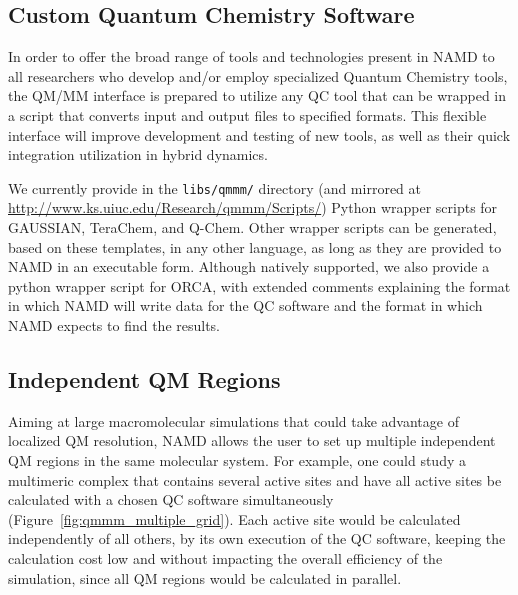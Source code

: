 \subsection{Custom Quantum Chemistry Software}

In order to offer the broad range of tools and technologies present 
in NAMD to all researchers who develop and/or employ specialized 
Quantum Chemistry tools, the QM/MM interface is prepared to utilize 
any QC tool that can be wrapped in a script that converts input and 
output files to specified formats. This flexible interface will 
improve development and testing of new tools, as well as their 
quick integration utilization in hybrid dynamics.

We currently provide 
in the \texttt{libs/qmmm/} directory
(and mirrored at
\url{http://www.ks.uiuc.edu/Research/qmmm/Scripts/})
Python wrapper scripts for GAUSSIAN, TeraChem, and Q-Chem.
Other wrapper scripts can be generated, based on these templates,
in any other language,
as long as they are provided to NAMD in an executable form.
Although natively supported,
we also provide a python wrapper script for ORCA,
with extended comments explaining the format in which NAMD will write 
data for the QC software and the format in which NAMD expects to find 
the results.


\subsection{Independent QM Regions}

Aiming at large macromolecular simulations that could take advantage 
of localized QM resolution, NAMD allows the user to set up multiple 
independent QM regions in the same molecular system. For example, 
one could study a multimeric complex that contains several active sites 
and have all active sites be calculated with a chosen QC software 
simultaneously (Figure~\ref{fig:qmmm_multiple_grid}).
Each active site would be calculated 
independently of all others, by its own execution of the QC software, 
keeping the calculation cost low and without impacting the overall 
efficiency of the simulation, since all QM regions would be calculated 
in parallel.

